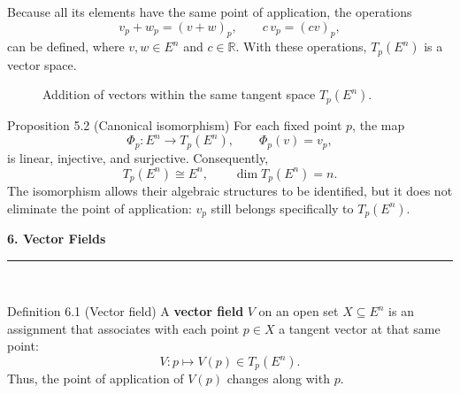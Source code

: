 \documentclass[11pt,letterpaper]{article}
\newcommand{\manualsection}[1]{%
  \Needspace{12\baselineskip}%
  \vspace{0.35cm}
  {\Large\bfseries\color{blackmain} #1}\\[2pt]
  {\color{orangeacc}\rule{\linewidth}{1.4pt}}\\[0.25cm]
}
\newcommand{\term}[1]{\textbf{\color{orangeacc}#1}}
\begin{document}
Because all its elements have the same point of application, the operations
\begin{equation}
  v_p+w_p=(v+w)_p,
  \qquad
  c\,v_p=(cv)_p,
\end{equation}
can be defined, where $v,w\in E^n$ and $c\in\mathbb R$. With these operations,
$T_p(E^n)$ is a vector space.

\begin{figure}[htbp]
\centering
{}
\caption{Addition of vectors within the same tangent space $T_p(E^n)$.}
\label{fig:tangent-addition}
\end{figure}
\FloatBarrier

\begin{theorembox}{Proposition 5.2 (Canonical isomorphism)}
For each fixed point $p$, the map
\begin{equation}
  \Phi_p:E^n\longrightarrow T_p(E^n),
  \qquad \Phi_p(v)=v_p,
\end{equation}
is linear, injective, and surjective. Consequently,
\begin{equation}
  T_p(E^n)\cong E^n,
  \qquad \dim T_p(E^n)=n.
\end{equation}
The isomorphism allows their algebraic structures to be identified, but it does
not eliminate the point of application: $v_p$ still belongs specifically to
$T_p(E^n)$.
\end{theorembox}

\manualsection{6. Vector Fields}

\begin{infobox}[orangeacc]{Definition 6.1 (Vector field)}
A \term{vector field} $V$ on an open set $X\subseteq E^n$ is an assignment that
associates with each point $p\in X$ a tangent vector at that same point:
\begin{equation}
  V:p\longmapsto V(p)\in T_p(E^n).
\end{equation}
Thus, the point of application of $V(p)$ changes along with $p$.
\end{infobox}
\end{document}
